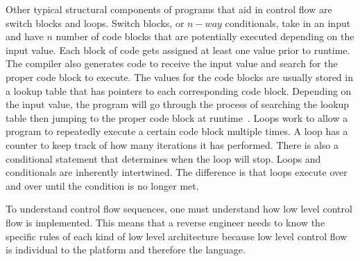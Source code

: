 \documentclass[12pt]{article}
\begin{document}
Other typical structural components of programs that aid in control flow are switch blocks and loops. Switch blocks, or \(n-way\) conditionals, take in an input and have \(n\) number of code blocks that are potentially executed depending on the input value. Each block of code gets assigned at least one value prior to runtime. The compiler also generates code to receive the input value and search for the proper code block to execute. The values for the code blocks are usually stored in a lookup table that has pointers to each corresponding code block.  Depending on the input value, the program will go through the process of searching the lookup table then jumping to the proper code block at runtime~\cite{Reversing}. Loops work to allow a program to repeatedly execute a certain code block multiple times. A loop has a counter to keep track of how many iterations it has performed. There is also a conditional statement that determines when the loop will stop. Loops and conditionals are inherently intertwined. The difference is that loops execute over and over until the condition is no longer met.

To understand control flow sequences, one must understand how low level control flow is implemented. This means that a reverse engineer needs to know the specific rules of each kind of low level architecture because low level control flow is individual to the platform and therefore the language.
\end{document}
